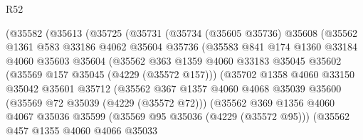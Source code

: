 \begin{lexlean}{R52}
\begin{coremodule}
                    (@35582
                      (@35613
                        (@35725
                          (@35731
                            (@35734
                              (@35605 @35736)
                              @35608
                              (@35562
                                @1361
                                @583
                                @33186
                                @4062
                                @35604
                                @35736
                                (@35583
                                  @841
                                  @174
                                  @1360
                                  @33184
                                  @4060
                                  @35603
                                  @35604
                                  (@35562
                                    @363
                                    @1359
                                    @4060
                                    @33183
                                    @35045
                                    @35602
                                    (@35569 @157 @35045 (@4229 (@35572 @157)))
                                    (@35702
                                      @1358
                                      @4060
                                      @33150
                                      @35042
                                      @35601
                                      @35712
                                      (@35562
                                        @367
                                        @1357
                                        @4060
                                        @4068
                                        @35039
                                        @35600
                                        (@35569 @72 @35039 (@4229 (@35572 @72)))
                                        (@35562
                                          @369
                                          @1356
                                          @4060
                                          @4067
                                          @35036
                                          @35599
                                          (@35569 @95 @35036 (@4229 (@35572 @95)))
                                          (@35562
                                            @457
                                            @1355
                                            @4060
                                            @4066
                                            @35033

\end{coremodule}
\end{lexlean}
